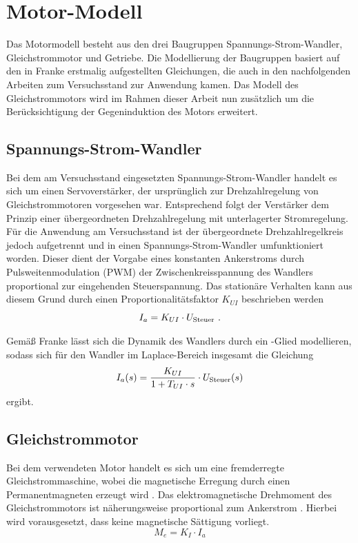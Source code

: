 \section{Motor-Modell}

Das Motormodell besteht aus den drei Baugruppen Spannungs-Strom-Wandler, Gleichstrommotor und Getriebe. Die Modellierung der Baugruppen basiert auf den in Franke \cite{franke} erstmalig aufgestellten Gleichungen, die auch in den nachfolgenden Arbeiten zum Versuchsstand zur Anwendung kamen. Das Modell des Gleichstrommotors wird im Rahmen dieser Arbeit nun zusätzlich um die Berücksichtigung der Gegeninduktion des Motors erweitert.

\subsection{Spannungs-Strom-Wandler}

Bei dem am Versuchsstand eingesetzten Spannungs-Strom-Wandler handelt es sich um einen Servoverstärker, der ursprünglich zur Drehzahlregelung von Gleichstrommotoren vorgesehen war. Entsprechend folgt der Verstärker dem Prinzip einer übergeordneten Drehzahlregelung mit unterlagerter Stromregelung. Für die Anwendung am Versuchsstand ist der übergeordnete Drehzahlregelkreis jedoch aufgetrennt und in einen Spannungs-Strom-Wandler umfunktioniert worden. Dieser dient der Vorgabe eines konstanten Ankerstroms durch Pulsweitenmodulation (PWM) der Zwischenkreisspannung des Wandlers proportional zur eingehenden Steuerspannung. Das stationäre Verhalten kann aus diesem Grund durch einen Proportionalitätsfaktor $K_{UI}$ beschrieben werden
	\[
	I_a = K_{UI} \cdot U_{\mathrm{Steuer}} \ .
\]

Gemäß Franke \cite{franke} lässt sich die Dynamik des Wandlers durch ein -Glied modellieren, sodass sich für den Wandler im Laplace-Bereich insgesamt die Gleichung
	\[
	I_a(s) = \frac{K_{UI}}{1+T_{UI} \cdot s} \cdot U_{\mathrm{Steuer}}(s)
	\]
ergibt.


\subsection{Gleichstrommotor}\label{sec:gsm}

Bei dem verwendeten Motor handelt es sich um eine fremderregte Gleichstrommaschine, wobei die magnetische Erregung durch einen Permanentmagneten erzeugt wird \cite{franke}. Das elektromagnetische Drehmoment des Gleichstrommotors ist näherungsweise proportional zum Ankerstrom \cite{binder}. Hierbei wird vorausgesetzt, dass keine magnetische Sättigung vorliegt.
\[
	M_e = K_I \cdot I_a
\]

